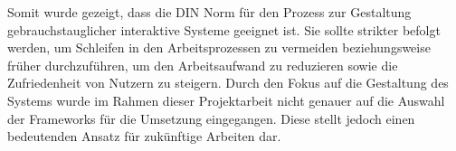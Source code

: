 Somit wurde gezeigt, dass die DIN Norm für den Prozess zur Gestaltung gebrauchstauglicher interaktive Systeme geeignet ist. Sie sollte strikter befolgt werden, um Schleifen in den Arbeitsprozessen zu vermeiden beziehungsweise früher durchzuführen, um den Arbeitsaufwand zu reduzieren sowie die Zufriedenheit von Nutzern zu steigern.
Durch den Fokus auf die Gestaltung des Systems wurde im Rahmen dieser Projektarbeit nicht genauer auf die Auswahl der Frameworks für die Umsetzung eingegangen. Diese stellt jedoch einen bedeutenden Ansatz für zukünftige Arbeiten dar.
